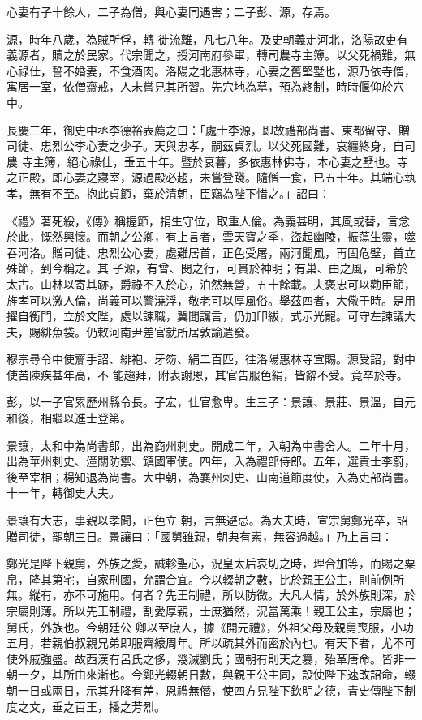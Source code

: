 \begin{pinyinscope}
 心妻有子十餘人，二子為僧，與心妻同遇害；二子彭、源，存焉。



 源，時年八歲，為賊所俘，轉
 徙流離，凡七八年。及史朝義走河北，洛陽故吏有義源者，贖之於民家。代宗聞之，授河南府參軍，轉司農寺主簿。以父死禍難，無心祿仕，誓不婚妻，不食酒肉。洛陽之北惠林寺，心妻之舊堅墅也，源乃依寺僧，寓居一室，依僧齋戒，人未嘗見其所習。先穴地為墓，預為終制，時時偃仰於穴中。



 長慶三年，御史中丞李德裕表薦之曰：「處士李源，即故禮部尚書、東都留守、贈司徒、忠烈公李心妻之少子。天與忠孝，嗣茲貞烈。以父死國難，哀纏終身，自司農
 寺主簿，絕心祿仕，垂五十年。暨於衰暮，多依惠林佛寺，本心妻之墅也。寺之正殿，即心妻之寢室，源過殿必趨，未嘗登踐。隨僧一食，已五十年。其端心執孝，無有不至。抱此貞節，棄於清朝，臣竊為陛下惜之。」詔曰：



 《禮》著死綏，《傳》稱握節，捐生守位，取重人倫。為義甚明，其風或替，言念於此，慨然興懷。而朝之公卿，有上言者，雲天寶之季，盜起幽陵，振蕩生靈，噬吞河洛。贈司徒、忠烈公心妻，處難居首，正色受屠，兩河聞風，再固危壁，首立殊節，到今稱之。其
 子源，有曾、閔之行，可貫於神明；有巢、由之風，可希於太古。山林以寄其跡，爵祿不入於心，泊然無營，五十餘載。夫褒忠可以勸臣節，旌孝可以激人倫，尚義可以警澆浮，敬老可以厚風俗。舉茲四者，大儆于時。是用擢自衡門，立於文陛，處以諫職，冀聞讜言，仍加印紱，式示光寵。可守左諫議大夫，賜緋魚袋。仍敕河南尹差官就所居敦諭遣發。



 穆宗尋令中使齎手詔、緋袍、牙笏、絹二百匹，往洛陽惠林寺宣賜。源受詔，對中使苦陳疾甚年高，不
 能趨拜，附表謝恩，其官告服色絹，皆辭不受。竟卒於寺。



 彭，以一子官累歷州縣令長。子宏，仕官愈卑。生三子：景讓、景莊、景溫，自元和後，相繼以進士登第。



 景讓，太和中為尚書郎，出為商州刺史。開成二年，入朝為中書舍人。二年十月，出為華州刺史、潼關防禦、鎮國軍使。四年，入為禮部侍郎。五年，選貢士李蔚，後至宰相；楊知退為尚書。大中朝，為襄州刺史、山南道節度使，入為吏部尚書。十一年，轉御史大夫。



 景讓有大志，事親以孝聞，正色立
 朝，言無避忌。為大夫時，宣宗舅鄭光卒，詔贈司徒，罷朝三日。景讓曰：「國舅雖親，朝典有素，無容過越。」乃上言曰：



 鄭光是陛下親舅，外族之愛，誠軫聖心，況皇太后哀切之時，理合加等，而賜之粟帛，隆其第宅，自家刑國，允謂合宜。今以輟朝之數，比於親王公主，則前例所無。縱有，亦不可施用。何者？先王制禮，所以防微。大凡人情，於外族則深，於宗屬則薄。所以先王制禮，割愛厚親，士庶猶然，況當萬乘！親王公主，宗屬也；舅氏，外族也。今朝廷公
 卿以至庶人，據《開元禮》，外祖父母及親舅喪服，小功五月，若親伯叔親兄弟即服齊縗周年。所以疏其外而密於內也。有天下者，尤不可使外戚強盛。故西漢有呂氏之侈，幾滅劉氏；國朝有則天之篡，殆革唐命。皆非一朝一夕，其所由來漸也。今鄭光輟朝日數，與親王公主同，設使陛下速改詔命，輟朝一日或兩日，示其升降有差，恩禮無僭，使四方見陛下欽明之德，青史傳陛下制度之文，垂之百王，播之芳烈。




\end{pinyinscope}
